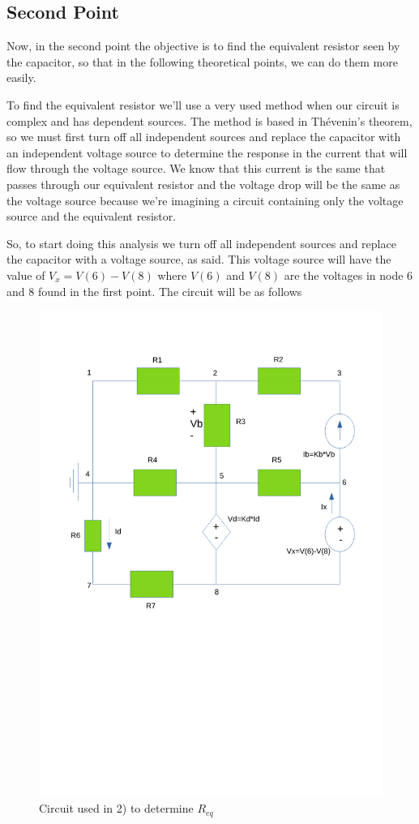 
\subsection{Second Point}
\label{ssec:2T}

\noindent \par Now, in the second point the objective is to find the equivalent resistor seen by the capacitor, so that in the following theoretical points, we can do them more easily.
\par To find the equivalent resistor we'll use a very used method when our circuit is complex and has dependent sources. The method is based in Thévenin's theorem, so we must first turn off all independent sources and replace the capacitor with an independent voltage source to determine the response in the current that will flow through the voltage source. We know that this current is the same that passes through our equivalent resistor and the voltage drop will be the same as the voltage source because we're imagining a circuit containing only the voltage source and the equivalent resistor. 
\par So, to start doing this analysis we turn off all independent sources and replace the capacitor with a voltage source, as said. This voltage source will have the value of $V_x=V(6)-V(8)$ where $V(6)$ and $V(8)$ are the voltages in node 6 and 8 found in the first point. The circuit will be as follows

\begin{figure}[H] \centering
\includegraphics[width=0.6\linewidth]{esquema.pdf}
\caption{Circuit used in 2) to determine $R_{eq}$}
\label{fig:Cir_2)}
\end{figure}


